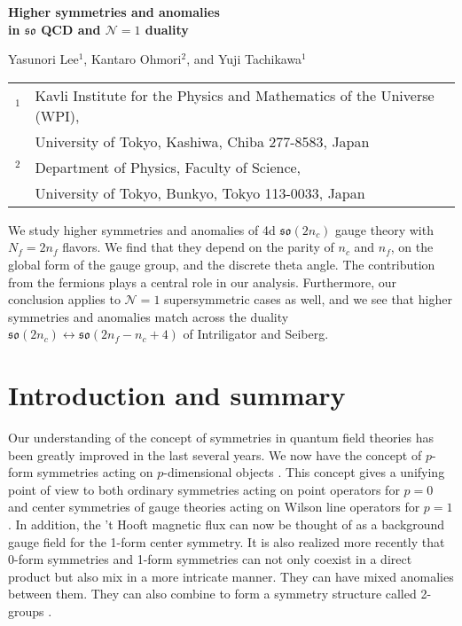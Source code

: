 \documentclass[12pt]{article}
\numberwithin{equation}{section}
\def\Nequals#1{$\mathcal{N}{=}#1$}
\def\so{\mathfrak{so}}
\begin{document}
\begin{titlepage}

\begin{flushright}
\end{flushright}

\vskip 3cm

\begin{center}

{\Large \bfseries Higher symmetries and anomalies \\[1em]
in $\so$ QCD  and \Nequals1 duality}

\vskip 1cm
Yasunori Lee$^1$, Kantaro Ohmori$^2$, and Yuji Tachikawa$^1$
\vskip 1cm

\begin{tabular}{ll}
$^1$ & Kavli Institute for the Physics and Mathematics of the Universe (WPI), \\
& University of Tokyo,  Kashiwa, Chiba 277-8583, Japan\\
$^2$ & Department of Physics, Faculty of Science, \\
& University of Tokyo, Bunkyo, Tokyo 113-0033, Japan
\end{tabular}

\vskip 1cm

\end{center}


\noindent
We study higher symmetries and anomalies of 4d  $\so(2n_c)$ gauge theory with $N_f=2n_f$ flavors.
We find that they depend on the parity of $n_c$ and $n_f$,
on the global form of the gauge group, and the discrete theta angle.
The contribution from the fermions plays a central role in our analysis.
Furthermore, our conclusion applies to \Nequals1 supersymmetric cases as well, and
we see that higher symmetries and anomalies match across the duality 
$\so(2n_c)\leftrightarrow\so(2n_f-n_c+4)$ of Intriligator and Seiberg.


\end{titlepage}

\setcounter{tocdepth}{3}
\tableofcontents

\section{Introduction and summary}
\label{sec:introduction}
Our understanding of the concept of symmetries in quantum field theories has been greatly improved in the last several years.
We now have the concept of $p$-form symmetries acting on $p$-dimensional objects \cite{Gaiotto:2014kfa}.
This concept  gives a unifying point of view to both
ordinary symmetries acting on point operators for $p=0$
and center symmetries of gauge theories acting on Wilson line operators for $p=1$.
In addition, the 't Hooft magnetic flux \cite{tHooft:1979rtg} can now be thought of as a background gauge field for the 1-form center symmetry.
It is also realized more recently that 0-form symmetries and 1-form symmetries can not only coexist in a direct product but also mix in a more intricate manner.
They can have mixed anomalies between them.
They can also combine to form a symmetry structure called 2-groups \cite{Cordova:2018cvg,Benini:2018reh}.
\end{document}
